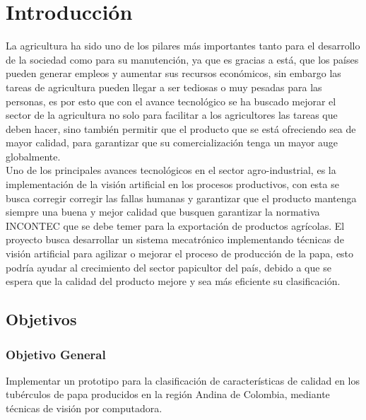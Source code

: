 \cleardoublepage %

\chapter{Introducción}

La agricultura ha sido uno de los pilares más importantes tanto para el desarrollo de la sociedad como para su manutención, ya que es gracias a está, que los países pueden generar empleos y aumentar sus recursos económicos, sin embargo las tareas de agricultura pueden llegar a ser tediosas o muy pesadas para las personas, es por esto que con el avance tecnológico se ha buscado mejorar el sector de la agricultura no solo para facilitar a los agricultores las tareas que deben hacer, sino también permitir que el producto que se está ofreciendo sea de mayor calidad, para garantizar que su comercialización tenga un mayor auge globalmente.\\

Uno de los principales avances tecnológicos en el sector agro-industrial, es la implementación de la visión artificial en los procesos productivos, con esta se busca corregir corregir las fallas humanas y garantizar que el producto mantenga siempre una buena y mejor calidad que busquen garantizar la normativa INCONTEC que se debe temer para la exportación de productos agrícolas. El proyecto busca desarrollar un sistema mecatrónico implementando técnicas de visión artificial para agilizar o mejorar el proceso de producción de la papa, esto podría ayudar al crecimiento del sector papicultor del país, debido a que se espera que la calidad del producto mejore y sea más eficiente su clasificación.


\newpage
\section{Objetivos}

\subsection{Objetivo General}

Implementar un prototipo para la clasificación de características de calidad en los tubérculos de papa producidos en la región Andina de Colombia, mediante técnicas de visión por computadora.


